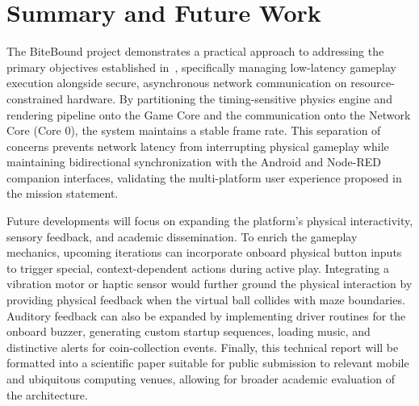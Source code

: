 \section{Summary and Future Work}
\label{sec:summary-future-work}

The BiteBound project demonstrates a practical approach to addressing the primary objectives established in~, specifically managing low-latency gameplay execution alongside secure, asynchronous network communication on resource-constrained hardware.
By partitioning the timing-sensitive physics engine and rendering pipeline onto the Game Core and the communication onto the Network Core (Core 0), the system maintains a stable frame rate.
This separation of concerns prevents network latency from interrupting physical gameplay while maintaining bidirectional synchronization with the Android and Node-RED companion interfaces, validating the multi-platform user experience proposed in the mission statement.

Future developments will focus on expanding the platform's physical interactivity, sensory feedback, and academic dissemination.
To enrich the gameplay mechanics, upcoming iterations can incorporate onboard physical button inputs to trigger special, context-dependent actions during active play.
Integrating a vibration motor or haptic sensor would further ground the physical interaction by providing physical feedback when the virtual ball collides with maze boundaries.
Auditory feedback can also be expanded by implementing driver routines for the onboard buzzer, generating custom startup sequences, loading music, and distinctive alerts for coin-collection events.
Finally, this technical report will be formatted into a scientific paper suitable for public submission to relevant mobile and ubiquitous computing venues, allowing for broader academic evaluation of the architecture.